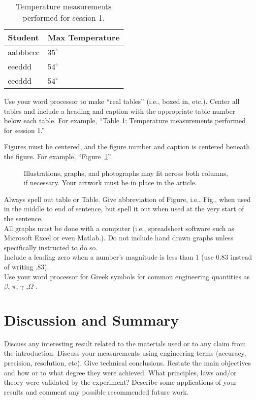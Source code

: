 \documentclass[journal]{IEEEtran}
\begin{document}
\begin{table}[!ht] %
\centering
\label{table:Exps}
\begin{tabular}{ll}
Student &  Max Temperature \\ \hline
aabbbccc &  $35^{\circ}$   \\
eeeddd &   $54^{\circ}$ \\
eeeddd &   $54^{\circ}$ \\
\end{tabular}
\caption{Temperature measurements performed for session 1.}
\end{table}


Use your word processor to make “real tables” (i.e., boxed in, etc.). Center all tables and include a heading and caption with the appropriate table number below each table. For example, “Table 1: Temperature measurements performed for session 1.” 

Figures must be centered, and the figure number and caption is centered beneath the
figure. For example, “Figure~\ref{fig:ecg}”. 

\begin{figure}[H]%
\begin {center}
\caption{Illustrations, graphs, and photographs may fit across both columns, if necessary. Your artwork must be in place in the article.}
\label{fig:ecg}
\end {center}
\end{figure}

Always spell out table or Table. Give abbreviation of Figure, i.e., Fig., when used in
the middle to end of sentence, but spell it out when used at the very start of the
sentence. \\


All graphs must be done with a computer (i.e., spreadsheet software such as
Microsoft Excel or even Matlab.). Do not include hand drawn graphs unless
specifically instructed to do so.  \\
Include a leading zero when a number’s magnitude is less than 1 (use 0.83 instead of
writing .83). \\
Use your word processor for Greek symbols for common engineering quantities as $\beta$, $\pi$, $\gamma$ ,$\Omega$ . 

\section{Discussion and Summary}
Discuss any interesting result related to the materials used or to any claim from the introduction. Discuss your measurements using engineering terms (accuracy, precision, resolution, etc).  Give technical conclusions. Restate the main objectives and how or to what degree they were achieved. What principles, laws and/or theory
were validated by the experiment? Describe some applications of your results and comment any possible recommended future work.
\end{document}

